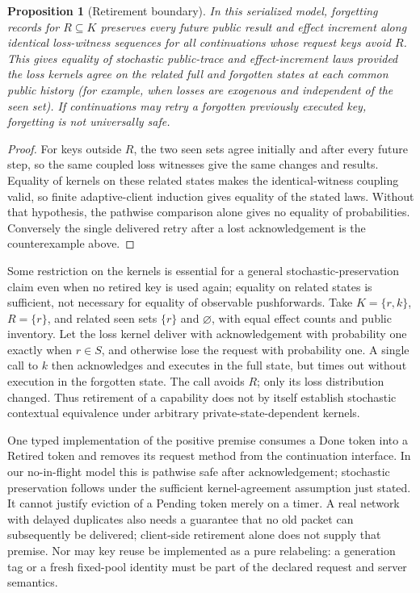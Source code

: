 \documentclass[11pt]{article}
\newtheorem{proposition}[theorem]{Proposition}
\begin{document}
\begin{proposition}[Retirement boundary]
In this serialized model, forgetting records for $R\subseteq K$ preserves every future public result and effect increment along identical loss-witness sequences for all continuations whose request keys avoid $R$. This gives equality of stochastic public-trace and effect-increment laws provided the loss kernels agree on the related full and forgotten states at each common public history (for example, when losses are exogenous and independent of the seen set). If continuations may retry a forgotten previously executed key, forgetting is not universally safe.
\end{proposition}
\begin{proof}
For keys outside $R$, the two seen sets agree initially and after every future step, so the same coupled loss witnesses give the same changes and results. Equality of kernels on these related states makes the identical-witness coupling valid, so finite adaptive-client induction gives equality of the stated laws. Without that hypothesis, the pathwise comparison alone gives no equality of probabilities. Conversely the single delivered retry after a lost acknowledgement is the counterexample above.\end{proof}

Some restriction on the kernels is essential for a general stochastic-preservation claim even when no retired key is used again; equality on related states is sufficient, not necessary for equality of observable pushforwards. Take $K=\{r,k\}$, $R=\{r\}$, and related seen sets $\{r\}$ and $\varnothing$, with equal effect counts and public inventory. Let the loss kernel deliver with acknowledgement with probability one exactly when $r\in S$, and otherwise lose the request with probability one. A single call to $k$ then acknowledges and executes in the full state, but times out without execution in the forgotten state. The call avoids $R$; only its loss distribution changed. Thus retirement of a capability does not by itself establish stochastic contextual equivalence under arbitrary private-state-dependent kernels.

One typed implementation of the positive premise consumes a Done token into a Retired token and removes its request method from the continuation interface. In our no-in-flight model this is pathwise safe after acknowledgement; stochastic preservation follows under the sufficient kernel-agreement assumption just stated. It cannot justify eviction of a Pending token merely on a timer. A real network with delayed duplicates also needs a guarantee that no old packet can subsequently be delivered; client-side retirement alone does not supply that premise. Nor may key reuse be implemented as a pure relabeling: a generation tag or a fresh fixed-pool identity must be part of the declared request and server semantics.
\end{document}

